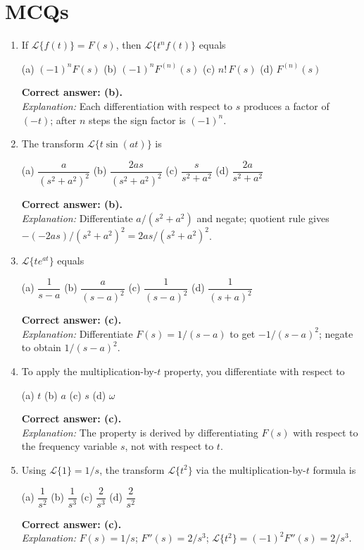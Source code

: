 \documentclass[12pt,a4paper]{article}
\begin{document}
\section{MCQs}
\begin{enumerate}

\item If $\mathcal{L}\{f(t)\}=F(s)$, then $\mathcal{L}\{t^n f(t)\}$ equals

(a) $(-1)^n F(s)$\quad
(b) $(-1)^n F^{(n)}(s)$\quad
(c) $n!\,F(s)$\quad
(d) $F^{(n)}(s)$

\textbf{Correct answer: (b).}\\
\textit{Explanation:} Each differentiation with respect to $s$ produces a factor
of $(-t)$; after $n$ steps the sign factor is $(-1)^n$.

\item The transform $\mathcal{L}\{t\sin(at)\}$ is

(a) $\dfrac{a}{(s^2+a^2)^2}$\quad
(b) $\dfrac{2as}{(s^2+a^2)^2}$\quad
(c) $\dfrac{s}{s^2+a^2}$\quad
(d) $\dfrac{2a}{s^2+a^2}$

\textbf{Correct answer: (b).}\\
\textit{Explanation:} Differentiate $a/(s^2+a^2)$ and negate;
quotient rule gives $-(-2as)/(s^2+a^2)^2=2as/(s^2+a^2)^2$.

\item $\mathcal{L}\{te^{at}\}$ equals

(a) $\dfrac{1}{s-a}$\quad
(b) $\dfrac{a}{(s-a)^2}$\quad
(c) $\dfrac{1}{(s-a)^2}$\quad
(d) $\dfrac{1}{(s+a)^2}$

\textbf{Correct answer: (c).}\\
\textit{Explanation:} Differentiate $F(s)=1/(s-a)$ to get $-1/(s-a)^2$; negate
to obtain $1/(s-a)^2$.

\item To apply the multiplication-by-$t$ property, you differentiate with
respect to

(a) $t$\quad
(b) $a$\quad
(c) $s$\quad
(d) $\omega$

\textbf{Correct answer: (c).}\\
\textit{Explanation:} The property is derived by differentiating $F(s)$ with
respect to the frequency variable $s$, not with respect to $t$.

\item Using $\mathcal{L}\{1\}=1/s$, the transform $\mathcal{L}\{t^2\}$ via
the multiplication-by-$t$ formula is

(a) $\dfrac{1}{s^2}$\quad
(b) $\dfrac{1}{s^3}$\quad
(c) $\dfrac{2}{s^3}$\quad
(d) $\dfrac{2}{s^2}$

\textbf{Correct answer: (c).}\\
\textit{Explanation:} $F(s)=1/s$; $F''(s)=2/s^3$;
$\mathcal{L}\{t^2\}=(-1)^2 F''(s)=2/s^3$.

\end{enumerate}
\end{document}
